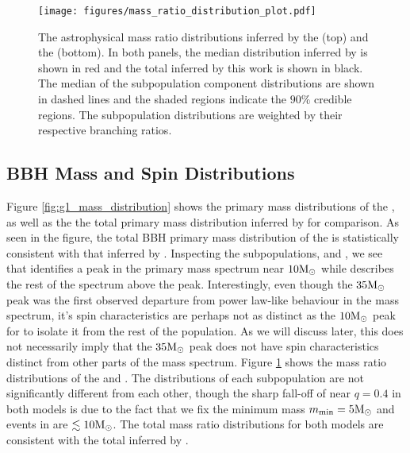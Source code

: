 \begin{figure}[ht!]
    \begin{centering}
        \texttt{[image: figures/mass\_ratio\_distribution\_plot.pdf]}
        \caption{The astrophysical mass ratio distributions inferred by the \base{} (top) and the \comp{} (bottom). In both panels, the median distribution inferred by \brucepaper is shown in red and the total inferred by this work is shown in black. The median of the subpopulation component distributions are shown in dashed lines and the shaded regions indicate the $90\%$ credible regions. The subpopulation distributions are weighted by their respective branching ratios.}
        \label{fig:mass_ratio_distribution}
    \end{centering}
\end{figure}

\subsection{BBH Mass and Spin Distributions}

Figure \ref{fig:g1_mass_distribution} shows the primary mass distributions of the \base{}, as well as the the total primary mass distribution inferred by \brucepaper{} for comparison. As seen in the figure, the total BBH primary mass distribution of the \base{} is statistically consistent with that inferred by \brucepaper{}. Inspecting the subpopulations, \first{} and \contB{}, we see that \first{} identifies a peak in the primary mass spectrum near $10{\rm M}_\odot$ while \contB{} describes the rest of the spectrum above the peak. Interestingly, even though the $35{\rm M}_\odot$ peak was the first observed departure from power law-like behaviour in the mass spectrum, it's spin characteristics are perhaps not as distinct as the $10{\rm M}_\odot$ peak for \first{} to isolate it from the rest of the population. As we will discuss later, this does not necessarily imply that the $35{\rm M}_\odot$ peak does not have spin characteristics distinct from other parts of the mass spectrum. Figure \ref{fig:mass_ratio_distribution} shows the mass ratio distributions of the \base{} and \comp{}. The distributions of each subpopulation are not significantly different from each other, though the sharp fall-off of \first{} near $q=0.4$ in both models is due to the fact that we fix the minimum mass $m_\text{min}=5{\rm M}_\odot$ and events in \first{} are $\lesssim10{\rm M}_\odot$. The total mass ratio distributions for both models are consistent with the total inferred by \brucepaper.  


